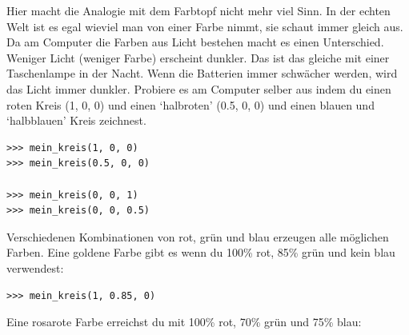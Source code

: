 Hier macht die Analogie mit dem Farbtopf nicht mehr viel Sinn. In der echten Welt ist es egal wieviel man von einer Farbe nimmt, sie schaut immer gleich aus. Da am Computer die Farben aus Licht bestehen macht es einen Unterschied. Weniger Licht (weniger Farbe) erscheint dunkler. Das ist das gleiche mit einer Taschenlampe in der Nacht. Wenn die Batterien immer schwächer werden, wird das Licht immer dunkler. Probiere es am Computer selber aus indem du einen roten Kreis (1, 0, 0) und einen `halbroten' (0.5, 0, 0) und einen blauen und `halbblauen' Kreis zeichnest.


\begin{Verbatim}[frame=single]
>>> mein_kreis(1, 0, 0)
>>> mein_kreis(0.5, 0, 0)

>>> mein_kreis(0, 0, 1)
>>> mein_kreis(0, 0, 0.5)
\end{Verbatim}

\noindent
Verschiedenen Kombinationen von rot, grün und blau erzeugen alle möglichen Farben. Eine goldene Farbe gibt es wenn du 100\% rot, 85\% grün und kein blau verwendest:

\begin{Verbatim}[frame=single]
>>> mein_kreis(1, 0.85, 0)
\end{Verbatim}

\noindent
Eine rosarote Farbe erreichst du mit 100\% rot, 70\% grün und 75\% blau:


